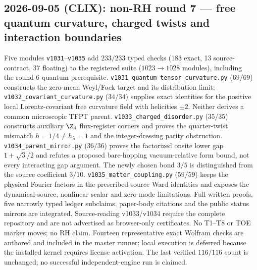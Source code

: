\subsection*{2026-09-05 (CLIX): non-RH round 7 --- free quantum curvature, charged twists and interaction boundaries}
Five modules \texttt{v1031}--\texttt{v1035} add $233/233$ typed checks
(183 exact, 13 source-contract, 37 floating) to the registered suite
($1023\to1028$ modules), including the round-6 quantum prerequisite.
\texttt{v1031\_quantum\_tensor\_curvature.py} ($69/69$) constructs the
zero-mean Weyl/Fock target and its distribution limit;
\texttt{v1032\_covariant\_curvature.py} ($34/34$) supplies exact
identities for the positive local Lorentz-covariant free curvature field
with helicities $\pm2$. Neither derives a common microscopic TFPT parent.
\texttt{v1033\_charged\_disorder.py} ($35/35$) constructs auxiliary
$\Z_4$ flux-register corners and proves the quarter-twist mismatch
$h=1/4\ne h_\lambda=1$ and the integer-dressing parity obstruction.
\texttt{v1034\_parent\_mirror.py} ($36/36$) proves the factorized
onsite lower gap $1+\sqrt3/2$ and refutes a proposed bare-hopping
vacuum-relative form bound, not every interacting gap argument. The
newly chosen bond $3/5$ is distinguished from the source coefficient $3/10$.
\texttt{v1035\_matter\_coupling.py} ($59/59$) keeps the physical
Fourier factors in the prescribed-source Ward identities and exposes
the dynamical-source, nonlinear scalar and zero-mode limitations.
Full written proofs, five narrowly typed ledger subclaims, paper-body
citations and the public status mirrors are integrated. Source-reading
v1033/v1034 require the complete repository and are not advertised as
browser-only certificates. No T1--T8 or TOE marker moves; no RH claim.
Fourteen representative exact Wolfram checks are authored and included in
the master runner; local execution is deferred because the installed
kernel requires license activation. The last verified $116/116$ count
is unchanged; no successful independent-engine run is claimed.

